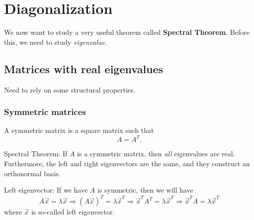 \chapter{Diagonalization}
We now want to study a very useful theorem called \textbf{Spectral Theorem}. Before this, we need to study \emph{eigenvalue}.
\section{Matrices with real eigenvalues}
Need to rely on some structural properties.

\subsection{Symmetric matrices}
\begin{definition}
	A symmetric matrix is a square matrix such that
	\[
		A = A^{T}.
	\]
\end{definition}

\begin{theorem}
	\label{Spectral Theorem}
	Spectral Theorem: If $A$ is a symmetric matrix, then \emph{all} eigenvalues are real. Furthermore, the left and right
	eigenvectors are the same, and they construct an orthonormal basis.
\end{theorem}

\begin{definition}
	Left eigenvector: If we have $A$ is symmetric, then we will have
	\[
		A \vec{x} = \lambda \vec{x}\Rightarrow
		(A \vec{x})^T = \lambda \vec{x}^T\Rightarrow
		\vec{x}^T A^T = \lambda\vec{x}^T\Rightarrow
		\vec{x}^T A = \lambda\vec{x}^T
	\]
	where $\vec{x}$ is so-called left eigenvector.
\end{definition}


